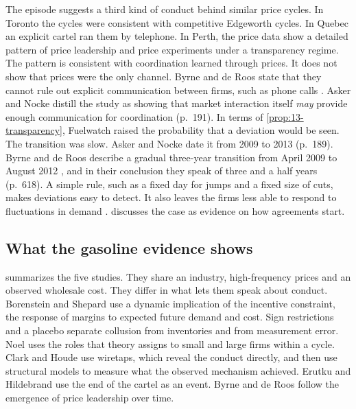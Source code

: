 The episode suggests a third kind of conduct behind similar price cycles. In Toronto the cycles were consistent with
competitive Edgeworth cycles. In Quebec an explicit cartel ran them by telephone. In Perth, the price data show a
detailed pattern of price leadership and price experiments under a transparency regime. The pattern is consistent
with coordination learned through prices. It does not show that prices were the only channel. Byrne and de Roos
state that they cannot rule out explicit communication between firms, such as phone calls
\citep[p.~617]{ByrneDeRoos2019}. Asker and Nocke distill the study as showing that market interaction itself \emph{may}
provide enough communication for coordination (p.~191). In terms of \cref{prop:13-transparency}, Fuelwatch raised the probability
that a deviation would be seen. The transition was slow. Asker and Nocke date it from 2009 to 2013 (p.~189).
Byrne and de Roos describe a gradual three-year transition from April 2009 to August 2012
\citep[p.~592]{ByrneDeRoos2019}, and in their conclusion they speak of three and a half years (p.~618). A simple
rule, such as a fixed day for jumps and a fixed size of cuts, makes deviations easy to detect. It also leaves the firms less able to respond to fluctuations in demand
\citep[p.~194]{AskerNocke2021}.  discusses the case as evidence on how agreements start.

\subsection{What the gasoline evidence shows}\label{sec:13-gas-synthesis}

 summarizes the five studies. They share an industry, high-frequency prices and an observed wholesale cost.
They differ in what lets them speak about conduct. Borenstein and Shepard use a dynamic implication of the incentive constraint,
the response of margins to expected future demand and cost. Sign restrictions and a placebo separate collusion from inventories and
from measurement error. Noel uses the roles that theory assigns to small and large firms within a cycle. Clark and Houde use wiretaps,
which reveal the conduct directly, and then use structural models to measure what the observed mechanism achieved. Erutku and
Hildebrand use the end of the cartel as an event. Byrne and de Roos follow the emergence of price leadership over time.

